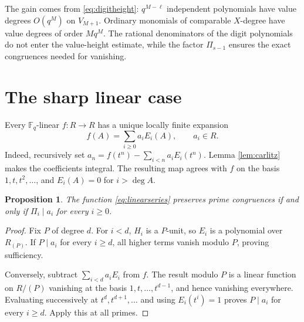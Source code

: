 \documentclass[11pt]{article}
\newtheorem{proposition}[theorem]{Proposition}
\newcommand{\F}{\mathbb F}
\begin{document}
The gain comes from \eqref{eq:digitheight}: $q^{M-\ell}$ independent
polynomials have value degrees $O(q^M)$ on $V_{M+1}$. Ordinary monomials
of comparable $X$-degree have value degrees of order $Mq^M$.
The rational denominators of the digit polynomials do not enter the
value-height estimate, while the factor $\Pi_{s-1}$ ensures the exact
congruences needed for vanishing.

\section{The sharp linear case}
Every $\F_q$-linear $f:R\to R$ has a unique locally finite expansion
\begin{equation}\label{eq:linearseries}
 f(A)=\sum_{i\ge0}a_iE_i(A),\qquad a_i\in R.
\end{equation}
Indeed, recursively set
$a_n=f(t^n)-\sum_{i<n}a_iE_i(t^n)$. Lemma \ref{lem:carlitz} makes
the coefficients integral. The resulting map agrees with $f$ on the
basis $1,t,t^2,\ldots$, and $E_i(A)=0$ for $i>\deg A$.

\begin{proposition}\label{prop:linearcriterion}
The function \eqref{eq:linearseries} preserves prime congruences if and
only if $\Pi_i\mid a_i$ for every $i\ge0$.
\end{proposition}
\begin{proof}
Fix $P$ of degree $d$. For $i<d$, $H_i$ is a $P$-unit, so $E_i$ is a
polynomial over $R_{(P)}$. If $P\mid a_i$ for every $i\ge d$, all higher
terms vanish modulo $P$, proving sufficiency.

Conversely, subtract $\sum_{i<d}a_iE_i$ from $f$. The result modulo $P$
is a linear function on $R/(P)$ vanishing at the basis
$1,t,\ldots,t^{d-1}$, and hence vanishing everywhere.
Evaluating successively at $t^d,t^{d+1},\ldots$ and using
$E_i(t^i)=1$ proves $P\mid a_i$ for every $i\ge d$.
Apply this at all primes.
\end{proof}
\end{document}
